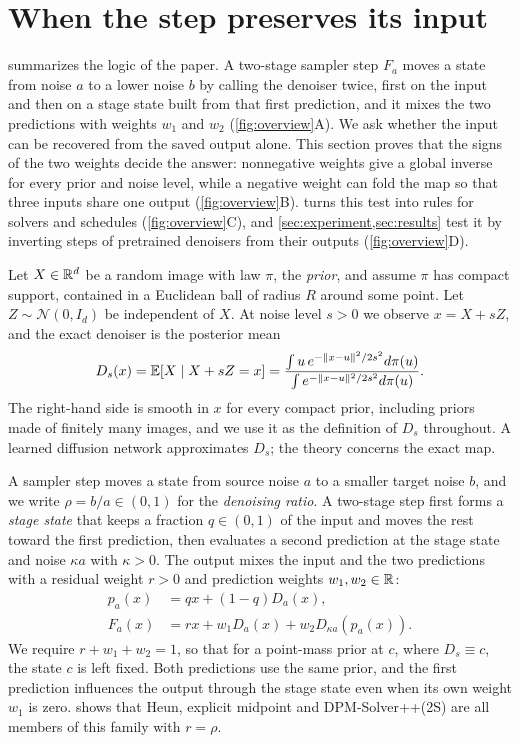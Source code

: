 \section{When the step preserves its input}
\label{sec:theory}
 summarizes the logic of the paper. A two-stage sampler step $F_a$ moves a state from noise $a$ to a lower noise $b$ by calling the denoiser twice, first on the input and then on a stage state built from that first prediction, and it mixes the two predictions with weights $w_1$ and $w_2$ (\cref{fig:overview}A). We ask whether the input can be recovered from the saved output alone. This section proves that the signs of the two weights decide the answer: nonnegative weights give a global inverse for every prior and noise level, while a negative weight can fold the map so that three inputs share one output (\cref{fig:overview}B).  turns this test into rules for solvers and schedules (\cref{fig:overview}C), and \cref{sec:experiment,sec:results} test it by inverting steps of pretrained denoisers from their outputs (\cref{fig:overview}D).

Let $X\in\mathbb R^d$ be a random image with law $\pi$, the \emph{prior}, and assume $\pi$ has compact support, contained in a Euclidean ball of radius $R$ around some point. Let $Z\sim\mathcal N(0,I_d)$ be independent of $X$. At noise level $s>0$ we observe $x=X+sZ$, and the exact denoiser is the posterior mean
\begin{equation}
 D_s(x)=\mathbb E[X\mid X+sZ=x]
 =\frac{\int u\,e^{-\|x-u\|^2/2s^2}d\pi(u)}{\int e^{-\|x-u\|^2/2s^2}d\pi(u)}.
 \label{eq:posterior}
\end{equation}
The right-hand side is smooth in $x$ for every compact prior, including priors made of finitely many images, and we use it as the definition of $D_s$ throughout. A learned diffusion network approximates $D_s$; the theory concerns the exact map.

A sampler step moves a state from source noise $a$ to a smaller target noise $b$, and we write $\rho=b/a\in(0,1)$ for the \emph{denoising ratio}. A two-stage step first forms a \emph{stage state} that keeps a fraction $q\in(0,1)$ of the input and moves the rest toward the first prediction, then evaluates a second prediction at the stage state and noise $\kappa a$ with $\kappa>0$. The output mixes the input and the two predictions with a residual weight $r>0$ and prediction weights $w_1,w_2\in\mathbb R$:
\begin{align}
 p_a(x)&=qx+(1-q)D_a(x),\nonumber\\
 F_a(x)&=rx+w_1D_a(x)+w_2D_{\kappa a}(p_a(x)).
 \label{eq:family}
\end{align}
We require $r+w_1+w_2=1$, so that for a point-mass prior at $c$, where $D_s\equiv c$, the state $c$ is left fixed. Both predictions use the same prior, and the first prediction influences the output through the stage state even when its own weight $w_1$ is zero.  shows that Heun, explicit midpoint and DPM-Solver++(2S) are all members of this family with $r=\rho$.

